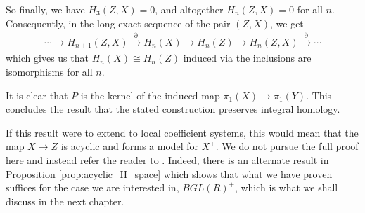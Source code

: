 So finally, we have $H_3(Z,X) = 0$, and altogether $H_n(Z,X) = 0$ for all $n$. 
Consequently, in the long exact sequence of the pair $(Z,X)$, we get
\begin{align*}
  \cdots \to H_{n+1}(Z,X) \xrightarrow{\partial} H_n(X) \to H_n(Z) \to H_n(Z,X) \xrightarrow{\partial} \cdots 
\end{align*}
which gives us that $H_n(X) \cong H_n(Z)$ induced via the inclusions are isomorphisms for all $n$.

It is clear that $P$ is the kernel of the induced map $\pi_1(X) \to \pi_1(Y)$.
This concludes the result that the stated construction preserves integral homology. 


If this result were to extend to local coefficient systems, this would mean that the map $X \to Z$ is acyclic 
and forms a model for $X^+$. We do not pursue the full proof here and instead refer the reader to \cite{Rosenberg}.
Indeed, there is an alternate result in Proposition \ref{prop:acyclic_H_space} which shows that what we have proven suffices
for the case we are interested in, $BGL(R)^+$, which is what we shall discuss in the next chapter.

